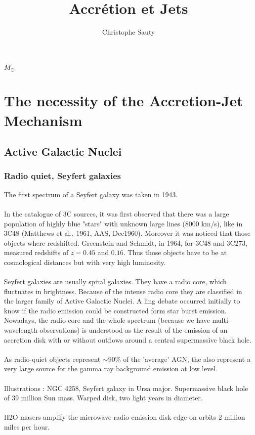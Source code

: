 \documentclass[10pt,a4paper]{article}
\author{Christophe Sauty}
\title{Accrétion et Jets}
\begin{document}
\maketitle
\tableofcontents
\newpage
$M_{\odot}$
\section{The necessity of the Accretion-Jet Mechanism}
\subsection{Active Galactic Nuclei}
\subsubsection{Radio quiet, Seyfert galaxies}
The first spectrum of a Seyfert galaxy was taken in 1943.\\
\\
In the catalogue of 3C sources, it was first observed that there was a large population of highly blue "stars" with unknown large lines (8000 km/s), like in 3C48 (Matthews et al., 1961, AAS, Dec1960). Moreover it was noticed that those objects where redshifted. Greenstein and Schmidt, in 1964, for 3C48 and 3C273, measured redshifts of $z=0.45$ and $0.16$. Thus those objects have to be at cosmological distances but with very high luminosity.\\
\\
Seyfert galaxies are usually spiral galaxies. They have a radio core, which fluctuates in brightness. Because of the intense radio core they are classified in the larger family of Active Galactic Nuclei. A ling debate occurred initially to know if the radio emission could be constructed form star burst emission. Nowadays, the radio core and the whole spectrum (because we have multi-wavelength observations) is understood as the result of the emission of an accretion disk with or without outflows around a central supermassive black hole.\\
\\
As radio-quiet objects represent $\sim 90 \% $ of the 'average' AGN, the also represent a very large source for the gamma ray background emission at low level.\\
\\
Illustrations : NGC 4258, Seyfert galaxy in Ursa major. Supermassive black hole of 39 million Sun mass. Warped disk, two light years in diameter.\\
\\
H2O masers amplify the microwave radio emission disk edge-on orbits 2 million miles per hour.
\end{document}
